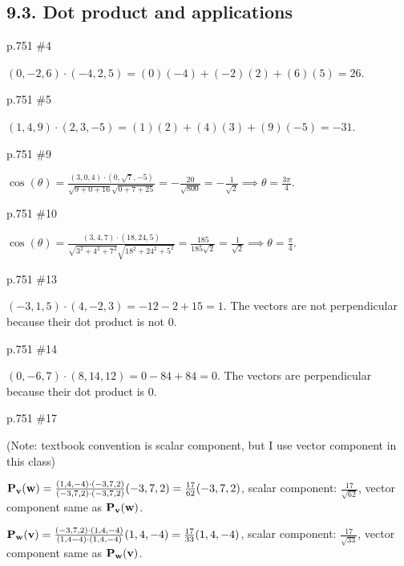 \subsection*{9.3. Dot product and applications}
\begin{practice}p.751 \#4\end{practice}
\begin{pracsol}
  $(0,-2,6)\cdot(-4,2,5)=(0)(-4)+(-2)(2)+(6)(5)=26$.
\end{pracsol}
\begin{practice}p.751 \#5\end{practice}
\begin{pracsol}
  $(1,4,9)\cdot(2,3,-5)=(1)(2)+(4)(3)+(9)(-5)=-31$.
\end{pracsol}
\begin{practice}p.751 \#9\end{practice}
\begin{pracsol}
  $\cos(\theta)=\frac{(3,0,4)\cdot(0,\sqrt7,-5)}{\sqrt{9+0+16}\sqrt{0+7+25}}=-\frac{20}{\sqrt{800}}=-\frac1{\sqrt2}\implies \theta=\frac{3\pi}4$.
\end{pracsol}
\begin{practice}p.751 \#10\end{practice}
\begin{pracsol}
  $\cos(\theta)=\frac{(3,4,7)\cdot(18,24,5)}{\sqrt{3^2+4^2+7^2}\sqrt{18^2+24^2+5^2}}=\frac{185}{185\sqrt2}=\frac 1{\sqrt2}\implies \theta=\frac{\pi}4$.
\end{pracsol}
\begin{practice}p.751 \#13\end{practice}
\begin{pracsol}
  $(-3,1,5)\cdot(4,-2,3)=-12-2+15=1$. The vectors are not perpendicular because their dot product is not 0.
\end{pracsol}
\begin{practice}p.751 \#14\end{practice}
\begin{pracsol}
  $(0,-6,7)\cdot(8,14,12)=0-84+84=0$. The vectors are perpendicular because their dot product is 0.
\end{pracsol}
\begin{practice}p.751 \#17\end{practice}
\begin{pracsol}
  (Note: textbook convention is scalar component, but I use vector component in this class)

  $\mathbf P_\mathbf v(\mathbf w)=\frac{(1,4,-4)\cdot(-3,7,2)}{(-3,7,2)\cdot(-3,7,2)}(-3,7,2)=\frac{17}{62}(-3,7,2)$, scalar component: $\frac{17}{\sqrt{62}}$, vector component same as $\mathbf P_\mathbf v(\mathbf w)$.

  $\mathbf P_\mathbf w(\mathbf v)=\frac{(-3,7,2)\cdot(1,4,-4)}{(1,4-4)\cdot(1,4,-4)}(1,4,-4)=\frac{17}{33}(1,4,-4)$, scalar component: $\frac{17}{\sqrt{33}}$, vector component same as $\mathbf P_\mathbf w(\mathbf v)$.
\end{pracsol}
